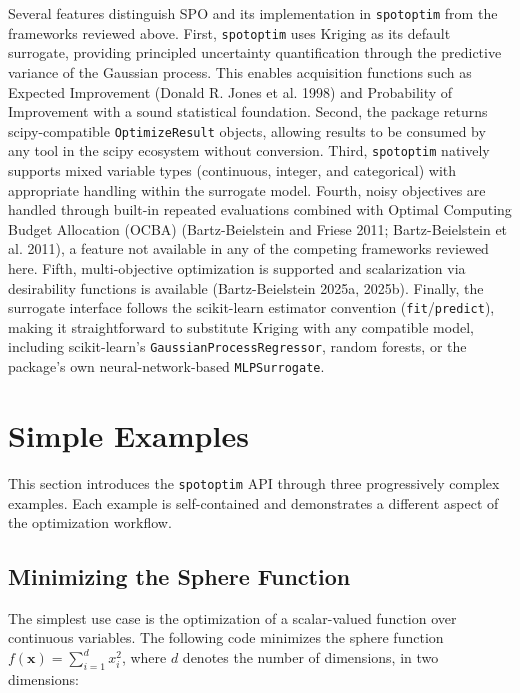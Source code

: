 \documentclass[
  twocolumn]{article}
\begin{document}
Several features distinguish SPO and its implementation in
\texttt{spotoptim} from the frameworks reviewed above. First,
\texttt{spotoptim} uses Kriging as its default surrogate, providing
principled uncertainty quantification through the predictive variance of
the Gaussian process. This enables acquisition functions such as
Expected Improvement (Donald R. Jones et al. 1998) and Probability of
Improvement with a sound statistical foundation. Second, the package
returns scipy-compatible \texttt{OptimizeResult} objects, allowing
results to be consumed by any tool in the scipy ecosystem without
conversion. Third, \texttt{spotoptim} natively supports mixed variable
types (continuous, integer, and categorical) with appropriate handling
within the surrogate model. Fourth, noisy objectives are handled through
built-in repeated evaluations combined with Optimal Computing Budget
Allocation (OCBA) (Bartz-Beielstein and Friese 2011; Bartz-Beielstein et
al. 2011), a feature not available in any of the competing frameworks
reviewed here. Fifth, multi-objective optimization is supported and
scalarization via desirability functions is available (Bartz-Beielstein
2025a, 2025b). Finally, the surrogate interface follows the scikit-learn
estimator convention (\texttt{fit}/\texttt{predict}), making it
straightforward to substitute Kriging with any compatible model,
including scikit-learn's \texttt{GaussianProcessRegressor}, random
forests, or the package's own neural-network-based
\texttt{MLPSurrogate}.

\section{Simple Examples}\label{sec-examples}

This section introduces the \texttt{spotoptim} API through three
progressively complex examples. Each example is self-contained and
demonstrates a different aspect of the optimization workflow.

\subsection{Minimizing the Sphere
Function}\label{minimizing-the-sphere-function}

The simplest use case is the optimization of a scalar-valued function
over continuous variables. The following code minimizes the sphere
function \(f(\mathbf{x}) = \sum_{i=1}^d x_i^2\), where \(d\) denotes the
number of dimensions, in two dimensions:
\end{document}
